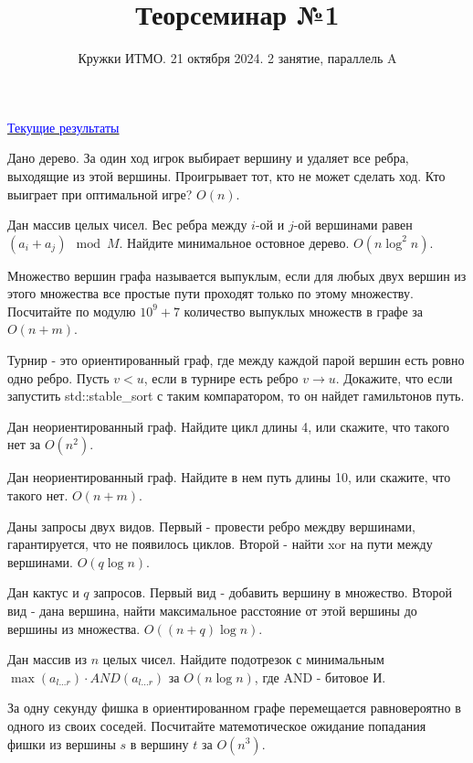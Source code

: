 \documentclass{article}
\title{Теорсеминар №1}
\author{Кружки ИТМО. 21 октября 2024. 2 занятие, параллель A}
\date{}
\begin{document}
	
	\maketitle
	
	\href{https://docs.google.com/spreadsheets/d/1qnffTfPXIDFcwWoBrO4RRApMNMjeVCJ56XNfXEh3JYo/edit?usp=sharing}{\textcolor{blue}{Текущие результаты}}

	
	\begin{tasks}
		\item Дано дерево. За один ход игрок выбирает вершину и удаляет все ребра, выходящие из этой вершины. Проигрывает тот, кто не может сделать ход. Кто выиграет при оптимальной игре? $O(n)$.
		\item Дан массив целых чисел. Вес ребра между $i$-ой и $j$-ой вершинами равен $(a_i + a_j) \mod M$. Найдите минимальное остовное дерево. $O(n \log^2 n)$.
		\item Множество вершин графа называется выпуклым, если для любых двух вершин из этого множества все простые пути проходят только по этому множеству. Посчитайте по модулю $10^9 + 7$ количество выпуклых множеств в графе за $O(n + m)$.
		\item Турнир - это ориентированный граф, где между каждой парой вершин есть ровно одно ребро. Пусть $v < u$, если в турнире есть ребро $v \rightarrow u$. Докажите, что если запустить std::stable\_sort с таким компаратором, то он найдет гамильтонов путь.

		\item Дан неориентированный граф. Найдите цикл длины 4, или скажите, что такого нет за $O(n^2)$.
		\item Дан неориентированный граф. Найдите в нем путь длины 10, или скажите, что такого нет. $O(n + m)$.
		\item Даны запросы двух видов. Первый - провести ребро междву вершинами, гарантируется, что не появилось циклов. Второй - найти xor на пути между вершинами. $O(q \log n)$.
		\item Дан кактус и $q$ запросов. Первый вид - добавить вершину в множество. Второй вид - дана вершина, найти максимальное расстояние от этой вершины до вершины из множества. $O((n + q) \log n)$.
		\item Дан массив из $n$ целых чисел. Найдите подотрезок с минимальным $\max(a_{l...r}) \cdot AND(a_{l...r})$ за $O(n \log n)$, где AND - битовое И.
		\item За одну секунду фишка в ориентированном графе  перемещается равновероятно в одного из своих соседей. Посчитайте матемотическое ожидание попадания фишки из вершины $s$ в вершину $t$ за $O(n^3)$.	\end{tasks}
\end{document}
